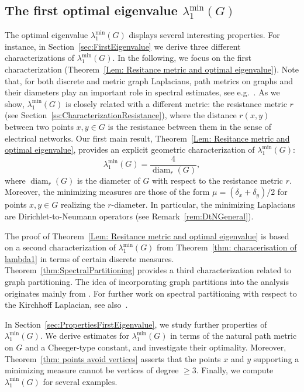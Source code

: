 \documentclass[reqno]{amsart}
\theoremstyle{plain}
\theoremstyle{definition}
\theoremstyle{remark}
\numberwithin{equation}{section}
\newcommand{\diam}{\operatorname{diam}}
\begin{document}
\subsection*{The first optimal eigenvalue $\lambda_1^{\min}(G)$} The optimal eigenvalue $\lambda_1^{\min}(G)$ displays several interesting properties. For instance, in Section~\ref{sec:FirstEigenvalue} we derive three different characterizations of $\lambda_1^{\min}(G)$. In the following, we focus on the first characterization (Theorem~\ref{Lem: Resitance metric and optimal eigenvalue}). Note that, for both discrete and metric graph Laplacians, path metrics on graphs and their diameters play an important role in spectral estimates, see e.g.~\cite{chung, grigoryanbook, kkmm}. As we show,  $\lambda_1^{\min}(G)$ is closely related with a different metric: the resistance metric $r$ (see Section~\ref{ss:CharacterizationResistance}), where the distance $r(x,y)$ between two points $x,y \in G$ is the resistance between them in the sense of electrical networks. Our first main result, Theorem~\ref{Lem: Resitance metric and optimal eigenvalue}, provides an explicit geometric characterization of $\lambda_1^{\min}(G)$:
\[
\lambda_1^{\min}(G) = \frac{4}{\diam_r(G)}, 
\]
where $\diam_r(G)$ is the diameter of $G$ with respect to the resistance metric $r$. Moreover, the minimizing measures are those of the form $\mu = (\delta_x + \delta_y)/2$ for points $x,y\in G$ realizing the $r$-diameter.
In particular, the minimizing Laplacians are Dirichlet-to-Neumann operators (see Remark~\ref{rem:DtNGeneral}).

The proof of Theorem~\ref{Lem: Resitance metric and optimal eigenvalue} is based on a second characterization of $\lambda_1^{\min}(G)$ from Theorem~\ref{thm: characerisation of lambda1} in terms of certain discrete measures. Theorem~\ref{thm:SpectralPartitioning} provides a third characterization related to graph partitioning. The idea of incorporating graph partitions into the analysis originates mainly from \cite{SpecPart}. For further work on spectral partitioning with respect to the Kirchhoff Laplacian, see also~\cite{Nodalcountandpartition,SpecPart2}.

\smallskip

In Section~\ref{sec:PropertiesFirstEigenvalue}, we study further properties of $\lambda_1^{\min}(G)$. We derive estimates for $\lambda_1^{\min}(G)$ in terms of the natural path metric on $G$ and a Cheeger-type constant, and investigate their optimality. Moreover, Theorem~\ref{thm: points avoid vertices} asserts that the points $x$ and $y$ supporting a minimizing measure cannot be vertices of degree $\ge 3$. Finally, we compute $\lambda_1^{\min}(G)$ for several examples.
\end{document}
